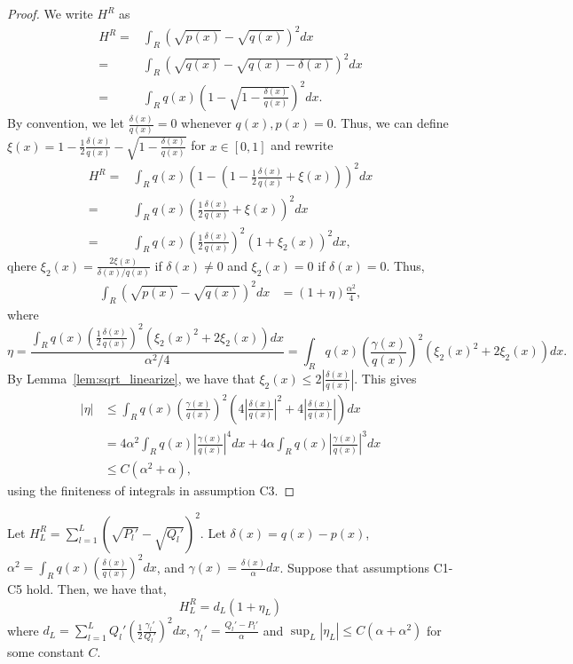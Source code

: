 \documentclass{article}
\begin{document}
\begin{proof}
We write $H^R$ as
\begin{align*}
H^R = &\int_R (\sqrt{p(x)} - \sqrt{q(x)})^2 dx \\
=& \int_R ( \sqrt{q(x)} - \sqrt{q(x) - \delta(x)} )^2 dx \\
=& \int_R q(x) \left( 1 - \sqrt{ 1 - \frac{\delta(x)}{q(x)}} \right)^2 dx. 
\end{align*}
By convention, we let $\frac{\delta(x)}{q(x)} = 0$ whenever $q(x), p(x) = 0$. Thus, we can define $\xi(x) = 1- \frac{1}{2} \frac{\delta(x)}{q(x)} - \sqrt{ 1 - \frac{\delta(x)}{q(x)}}$ for $x \in [0,1]$ and rewrite
\begin{align*}
H^R =& \int_R q(x) \left( 1 - (1 - \frac{1}{2} \frac{\delta(x)}{q(x)} + \xi(x) ) \right)^2 dx \\
=& \int_R q(x) \left( \frac{1}{2} \frac{\delta(x)}{q(x)} + \xi(x) \right)^2 dx\\ 
=& \int_R q(x) \left( \frac{1}{2} \frac{\delta(x)}{q(x)} \right)^2 \left( 1 + \xi_2(x) \right)^2 dx, 
\end{align*}
qhere $\xi_2(x) = \frac{2\xi(x)}{\delta(x)/q(x)}$ if $\delta(x) \neq 0$ and $\xi_2(x) =0$ if $\delta(x) = 0$. Thus,
\begin{align*}
\int_R \left( \sqrt{p(x)} - \sqrt{q(x)} \right)^2 dx &= (1 + \eta)\frac{\alpha^2}{4},
\end{align*}
where 
\[
\eta = \frac{\int_R q(x) \left( \frac{1}{2} \frac{\delta(x)}{q(x)} \right)^2 (\xi_2(x)^2 + 2\xi_2(x)) dx }
           { \alpha^2/4} =  \int_R q(x) \left(  \frac{\gamma(x)}{q(x)} \right)^2 (\xi_2(x)^2 + 2\xi_2(x)) dx.
\]
By Lemma~\ref{lem:sqrt_linearize}, we have that $\xi_2(x) \leq 2 \left| \frac{ \delta(x)}{q(x)} \right|$. This gives
\begin{align*}
| \eta | &\leq  \int_R q(x) \left(  \frac{\gamma(x)}{q(x)} \right)^2   \left( 4\left|\frac{\delta(x)}{q(x)} \right|^2 + 4\left| \frac{\delta(x)}{q(x)} \right| \right) dx\\
%
&= 4\alpha^2 \int_R q(x) \left|  \frac{\gamma(x)}{q(x)} \right |^4 dx + 4\alpha \int_R q(x) \left |  \frac{\gamma(x)}{q(x)} \right|^3 dx\\
%
    &\leq C (\alpha^2 + \alpha),
\end{align*}
using the finiteness of integrals in assumption C3.
\end{proof}




\begin{lemma}
\label{prop:discrete_hellinger_chi_square}
Let $H^R_L = \sum_{l=1}^L \left( \sqrt{P_l'} - \sqrt{Q_l'} \right)^2$. Let $\delta(x) = q(x) - p(x)$, $
\alpha^2 =  \int_R q(x) \left( \frac{\delta(x)}{q(x)} \right)^2 dx$, and $\gamma(x) = \frac{\delta(x)}{\alpha} dx$. Suppose that assumptions C1-C5 hold. Then, we have that, 
\[
H^R_L = d_L ( 1 + \eta_L )
\]
where $d_L = \sum_{l=1}^L Q_l' \left( \frac{1}{2} \frac{\gamma_l'}{Q_l'} \right)^2 dx$, $\gamma_l' = \frac{Q_l'-P_l'}{\alpha}$ and $\sup_L |\eta_L | \leq C(\alpha + \alpha^2)$ for some constant $C$.%
\end{lemma}
\end{document}
